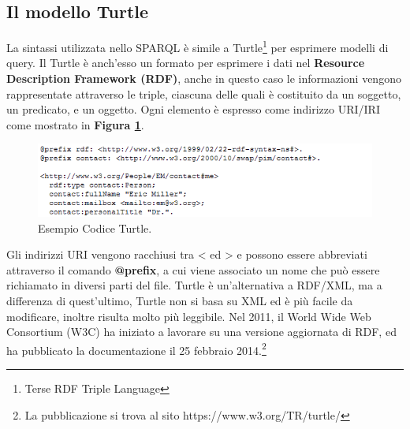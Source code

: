 \documentclass[a4paper,11pt]{article}
\begin{document}
\subsection{Il modello Turtle}
\label{sec:2.1}
La sintassi utilizzata nello SPARQL è simile a Turtle\footnote{Terse RDF Triple Language} per esprimere modelli di query. \newline 
Il Turtle è anch'esso un formato per esprimere i dati nel \textbf{Resource Description Framework (RDF)},  anche in questo caso le informazioni vengono rappresentate attraverso le triple, ciascuna delle quali è costituito da un soggetto, un predicato, e un oggetto. Ogni elemento è espresso come indirizzo URI/IRI come mostrato in \textbf{Figura \ref{fig:2}}.
\begin{figure}[htbp]
	\centering
	\includegraphics[scale=1]{turtle.png}
	\caption{Esempio Codice Turtle.}
	\label{fig:2}
\end{figure}
Gli indirizzi URI vengono racchiusi tra < ed > e possono essere abbreviati attraverso il comando \textbf{@prefix}, a cui viene associato un nome che può essere richiamato in diversi parti del file.\newline
Turtle è un'alternativa a RDF/XML, ma a differenza di quest'ultimo, Turtle non si basa su XML ed è più facile da modificare, inoltre risulta molto più leggibile.\newline
Nel 2011, il World Wide Web Consortium (W3C) ha iniziato a lavorare su una versione aggiornata di RDF, ed ha pubblicato la documentazione il 25 febbraio 2014.\footnote{La pubblicazione si trova al sito https://www.w3.org/TR/turtle/}
\end{document}
